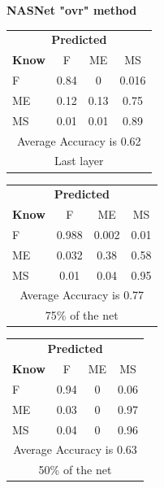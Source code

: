 \documentclass[12pt]{article} %
\begin{document}
\begin{center}
\textbf{NASNet "ovr" method}
\end{center}
\begin{minipage}{0.5\textwidth}
\begin{center}
\begin{tabular}{l|c|c|c|}
 \multicolumn{4}{c}{ \textbf{ Predicted}}\\
 \textbf{Know}&F&ME&MS\\ \hline\hline
F   &0.84&0&0.016\\
ME &0.12&0.13&0.75\\
MS &0.01&0.01&0.89\\
\multicolumn{4}{c}{Average Accuracy is 0.62}\\
\multicolumn{4}{c}{Last layer}\\
\end{tabular}
\end{center}
\end{minipage}
\begin{minipage}{0.5\textwidth}
\begin{center}
\begin{tabular}{l|c|c|c|}
 \multicolumn{4}{c}{ \textbf{ Predicted}}\\
 \textbf{Know}&F&ME&MS\\ \hline\hline
F    &0.988&0.002&0.01\\
ME &0.032&0.38&0.58\\
MS &0.01&0.04&0.95\\
\multicolumn{4}{c}{Average Accuracy is 0.77}\\
\multicolumn{4}{c}{75\%  of the net}\\
\end{tabular}
\end{center}
\end{minipage}
\begin{minipage}{0.5\textwidth}
\begin{center}
\begin{tabular}{l|c|c|c|}
 \multicolumn{4}{c}{ \textbf{ Predicted}}\\
 \textbf{Know}&F&ME&MS\\ \hline\hline
F   &0.94&0&0.06\\
ME &0.03&0&0.97\\
MS &0.04&0&0.96\\
\multicolumn{4}{c}{Average Accuracy is 0.63}\\
\multicolumn{4}{c}{50\%  of the net}\\
\end{tabular}
\end{center}
\end{minipage}
\end{document}
